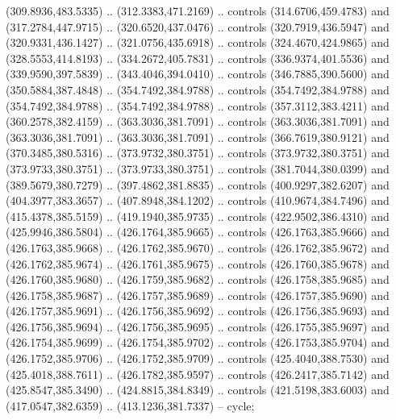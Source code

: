 \begin{scope}[shift={(69.41462,-293.94043)}]
    (309.8936,483.5335) .. (312.3383,471.2169) .. controls (314.6706,459.4783) and
    (317.2784,447.9715) .. (320.6520,437.0476) .. controls (320.7919,436.5947) and
    (320.9331,436.1427) .. (321.0756,435.6918) .. controls (324.4670,424.9865) and
    (328.5553,414.8193) .. (334.2672,405.7831) .. controls (336.9374,401.5536) and
    (339.9590,397.5839) .. (343.4046,394.0410) .. controls (346.7885,390.5600) and
    (350.5884,387.4848) .. (354.7492,384.9788) .. controls (354.7492,384.9788) and
    (354.7492,384.9788) .. (354.7492,384.9788) .. controls (357.3112,383.4211) and
    (360.2578,382.4159) .. (363.3036,381.7091) .. controls (363.3036,381.7091) and
    (363.3036,381.7091) .. (363.3036,381.7091) .. controls (366.7619,380.9121) and
    (370.3485,380.5316) .. (373.9732,380.3751) .. controls (373.9732,380.3751) and
    (373.9733,380.3751) .. (373.9733,380.3751) .. controls (381.7044,380.0399) and
    (389.5679,380.7279) .. (397.4862,381.8835) .. controls (400.9297,382.6207) and
    (404.3977,383.3657) .. (407.8948,384.1202) .. controls (410.9674,384.7496) and
    (415.4378,385.5159) .. (419.1940,385.9735) .. controls (422.9502,386.4310) and
    (425.9946,386.5804) .. (426.1764,385.9665) .. controls (426.1763,385.9666) and
    (426.1763,385.9668) .. (426.1762,385.9670) .. controls (426.1762,385.9672) and
    (426.1762,385.9674) .. (426.1761,385.9675) .. controls (426.1760,385.9678) and
    (426.1760,385.9680) .. (426.1759,385.9682) .. controls (426.1758,385.9685) and
    (426.1758,385.9687) .. (426.1757,385.9689) .. controls (426.1757,385.9690) and
    (426.1757,385.9691) .. (426.1756,385.9692) .. controls (426.1756,385.9693) and
    (426.1756,385.9694) .. (426.1756,385.9695) .. controls (426.1755,385.9697) and
    (426.1754,385.9699) .. (426.1754,385.9702) .. controls (426.1753,385.9704) and
    (426.1752,385.9706) .. (426.1752,385.9709) .. controls (425.4040,388.7530) and
    (425.4018,388.7611) .. (426.1782,385.9597) .. controls (426.2417,385.7142) and
    (425.8547,385.3490) .. (424.8815,384.8349) .. controls (421.5198,383.6003) and
    (417.0547,382.6359) .. (413.1236,381.7337) -- cycle;

\end{scope}



